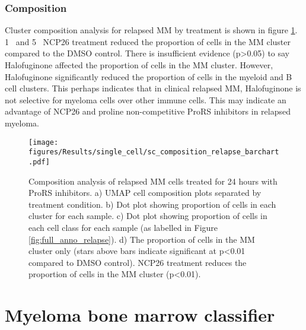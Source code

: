 \subsubsection{Composition}
Cluster composition analysis for relapsed MM by treatment is shown in figure \ref{fig:composition_relapse}.
1\si{\micro\Molar} and 5\si{\micro\Molar} NCP26 treatment reduced the proportion of cells in the MM cluster compared to the DMSO control.
There is insufficient evidence (p>0.05) to say Halofuginone affected the proportion of cells in the MM cluster.
However, Halofuginone significantly reduced the proportion of cells in the myeloid and B cell clusters.
This perhaps indicates that in clinical relapsed MM, Halofuginone is not selective for myeloma cells over other immune cells.
This may indicate an advantage of NCP26 and proline non-competitive ProRS inhibitors in relapsed myeloma. 


\begin{figure}[htb]
\centering
\texttt{[image: figures/Results/single\_cell/sc\_composition\_relapse\_barchart.pdf]}
\caption[scRNA-seq composition analysis- relapsed MM]{Composition analysis of relapsed MM cells treated for 24 hours with ProRS inhibitors.
    a) UMAP cell composition plots separated by treatment condition.
    b) Dot plot showing proportion of cells in each cluster for each sample.
    c) Dot plot showing proportion of cells in each cell class for each sample (as labelled in Figure \ref{fig:full_anno_relapse}).
    d) The proportion of cells in the MM cluster only (stars above bars indicate significant at p<0.01 compared to DMSO control).
NCP26 treatment reduces the proportion of cells in the MM cluster (p<0.01).}
\label{fig:composition_relapse}
\end{figure}

\clearpage
\section{Myeloma bone marrow classifier}